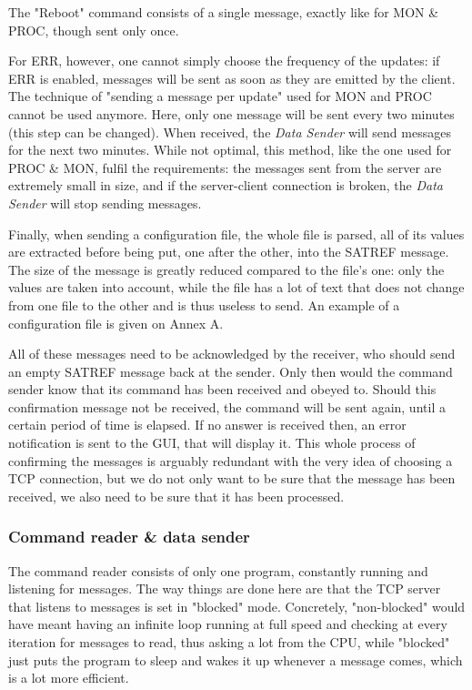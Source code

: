 \documentclass{themeensg}
\begin{document}
The "Reboot" command consists of a single message, exactly like for MON \& PROC, though sent only once. 

For ERR, however, one cannot simply choose the frequency of the updates: if ERR is enabled, messages will be sent as soon as they are emitted by the client. The technique of "sending a message per update" used for MON and PROC cannot be used anymore. Here, only one message will be sent every two minutes (this step can be changed). When received, the \textit{Data Sender} will send messages for the next two minutes. While not optimal, this method, like the one used for PROC \& MON, fulfil the requirements: the messages sent from the server are extremely small in size, and if the server-client connection is broken, the \textit{Data Sender} will stop sending messages.

Finally, when sending a configuration file, the whole file is parsed, all of its values are extracted before being put, one after the other, into the SATREF message. The size of the message is greatly reduced compared to the file's one: only the values are taken into account, while the file has a lot of text that does not change from one file to the other and is thus useless to send. An example of a configuration file is given on Annex A.

All of these messages need to be acknowledged by the receiver, who should send an empty SATREF message back at the sender. Only then would the command sender know that its command has been received and obeyed to. Should this confirmation message not be received, the command will be sent again, until a certain period of time is elapsed. If no answer is received then, an error notification is sent to the GUI, that will display it. This whole process of confirming the messages is arguably redundant with the very idea of choosing a TCP connection, but we do not only want to be sure that the message has been received, we also need to be sure that it has been processed.

\subsubsection{Command reader \& data sender}

The command reader consists of only one program, constantly running and listening for messages. The way things are done here are that the TCP server that listens to messages is set in "blocked" mode. Concretely, "non-blocked" would have meant having an infinite loop running at full speed and checking at every iteration for messages to read, thus asking a lot from the CPU, while "blocked" just puts the program to sleep and wakes it up whenever a message comes, which is a lot more efficient.
\end{document}

